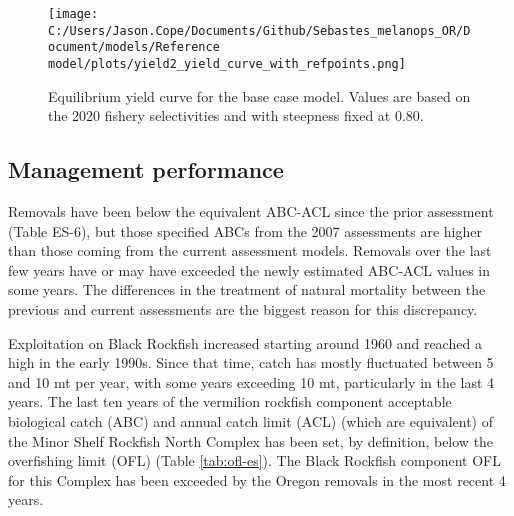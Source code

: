 \documentclass[11pt,
  english,
  letterpaper,
]{article}
\begin{document}
\begin{figure}
\centering
\texttt{[image: C:/Users/Jason.Cope/Documents/Github/Sebastes\_melanops\_OR/Document/models/Reference model/plots/yield2\_yield\_curve\_with\_refpoints.png]}
\caption{Equilibrium yield curve for the base case model. Values are based on the 2020 fishery selectivities and with steepness fixed at 0.80.\label{fig:es-yield}}
\end{figure}



\clearpage

\hypertarget{management-performance}{%
\subsection*{Management performance}\label{management-performance}}

Removals have been below the equivalent ABC-ACL since the prior assessment (Table ES-6), but those specified ABCs from the 2007 assessments are higher than those coming from the current assessment models. Removals over the last few years have or may have exceeded the newly estimated ABC-ACL values in some years. The differences in the treatment of natural mortality between the previous and current assessments are the biggest reason for this discrepancy.

Exploitation on Black Rockfish increased starting around 1960 and reached a high in the early 1990s. Since that time, catch has mostly fluctuated between 5 and 10 mt per year, with some years exceeding 10 mt, particularly in the last 4 years. The last ten years of the vermilion rockfish component acceptable biological catch (ABC) and annual catch limit (ACL) (which are equivalent) of the Minor Shelf Rockfish North Complex has been set, by definition, below the overfishing limit (OFL) (Table \ref{tab:ofl-es}). The Black Rockfish component OFL for this Complex has been exceeded by the Oregon removals in the most recent 4 years.

\begingroup\fontsize{10}{12}\selectfont
\begingroup\fontsize{10}{12}\selectfont
\end{document}
